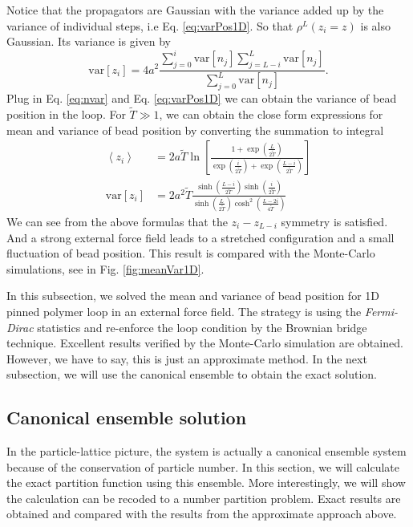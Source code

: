 Notice that the propagators are Gaussian with the variance added up by the variance of individual steps, i.e Eq. \eqref{eq:varPos1D}. So that $\rho^L(z_i = z)$ is also Gaussian. Its variance is given by
\begin{equation}
    \label{eq:varBrownianBridge}
    \text{var}\left[z_i\right] = 4a^2\frac{\sum_{j=0}^{i}\text{var}\left[n_j\right]\sum_{j=L-i}^{L}\text{var}\left[n_j\right]}{\sum_{j=0}^{L}\text{var}\left[n_j\right]}.
\end{equation}
Plug in Eq. \eqref{eq:nvar} and Eq. \eqref{eq:varPos1D} we can obtain the variance of bead position in the loop. For $\tilde{T}\gg 1$, we can obtain the close form expressions for mean and variance of bead position by converting the summation to integral
\begin{subequations}
    \label{eq:meanVarPos1DExpression}
    \begin{align}
        \left< z_i \right> & = 2 a \tilde{T} \ln\left[ \frac{1+\exp\left(\frac{L}{2\tilde{T}}\right)}{\exp\left(\frac{i}{2\tilde{T}}\right) + \exp\left(\frac{L-i}{2\tilde{T}}\right)} \right] \\
        \text{var}\left[z_i\right] & = 2 a^2 \tilde{T} \frac{ \sinh\left( \frac{L-i}{2\tilde{T}}\right) \sinh\left( \frac{i}{2\tilde{T}}\right)} {\sinh\left( \frac{L}{2\tilde{T}}\right) \cosh^2\left( \frac{L-2i}{4\tilde{T}}\right)}
    \end{align}
\end{subequations}
We can see from the above formulas that the $z_i-z_{L-i}$ symmetry is satisfied. And a strong external force field leads to a stretched configuration and a small fluctuation of bead position. This result is compared with the Monte-Carlo simulations, see in Fig. \ref{fig:meanVar1D}.

In this subsection, we solved the mean and variance of bead position for 1D pinned polymer loop in an external force field. The strategy is using the \emph{Fermi-Dirac} statistics and re-enforce the loop condition by the Brownian bridge technique. Excellent results verified by the Monte-Carlo simulation are obtained. However, we have to say, this is just an approximate method. In the next subsection, we will use the canonical ensemble to obtain the exact solution. 

\subsection{Canonical ensemble solution}
\label{sub:canonical_ensemble_solution}
In the particle-lattice picture, the system is actually a canonical ensemble system because of the conservation of particle number. In this section, we will calculate the exact partition function using this ensemble. More interestingly, we will show the calculation can be recoded to a number partition problem. Exact results are obtained and compared with the results from the approximate approach above.

